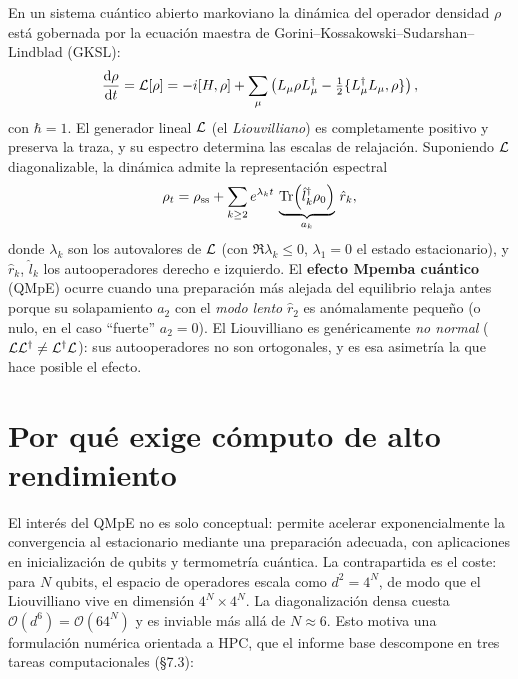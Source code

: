 En un sistema cuántico abierto markoviano la dinámica del operador densidad
$\rho$ está gobernada por la ecuación maestra de Gorini--Kossakowski--Sudarshan--Lindblad
(GKSL):
\begin{equation}
    \frac{\dd\rho}{\dd t} = \mathcal{L}[\rho]
    = -i[H,\rho] + \sum_{\mu}\left( L_\mu\rho L_\mu^\dagger
      - \tfrac{1}{2}\{L_\mu^\dagger L_\mu, \rho\}\right),
    \label{eq:gksl}
\end{equation}
con $\hbar=1$. El generador lineal $\mathcal{L}$ (el \emph{Liouvilliano}) es completamente
positivo y preserva la traza, y su espectro determina las escalas de relajación.
Suponiendo $\mathcal{L}$ diagonalizable, la dinámica admite la representación espectral
\begin{equation}
    \rho_t = \rho_{\mathrm{ss}} + \sum_{k\ge 2} e^{\lambda_k t}\,
             \underbrace{\Tr(\hat l_k^\dagger \rho_0)}_{a_k}\,\hat r_k,
    \label{eq:spectral}
\end{equation}
donde $\lambda_k$ son los autovalores de $\mathcal{L}$ (con $\Re\lambda_k\le 0$,
$\lambda_1=0$ el estado estacionario), y $\hat r_k$, $\hat l_k$ los autooperadores
derecho e izquierdo. El \textbf{efecto Mpemba cuántico} (QMpE) ocurre cuando una
preparación más alejada del equilibrio relaja antes porque su solapamiento $a_2$
con el \emph{modo lento} $\hat r_2$ es anómalamente pequeño (o nulo, en el caso
``fuerte'' $a_2=0$). El Liouvilliano es genéricamente \emph{no normal}
($\mathcal{L}\mathcal{L}^\dagger\neq\mathcal{L}^\dagger\mathcal{L}$): sus autooperadores no son ortogonales, y
es esa asimetría la que hace posible el efecto.

\section{Por qué exige cómputo de alto rendimiento}

El interés del QMpE no es solo conceptual: permite acelerar exponencialmente la
convergencia al estacionario mediante una preparación adecuada, con aplicaciones
en inicialización de qubits y termometría cuántica. La contrapartida es el coste:
para $N$ qubits, el espacio de operadores escala como $d^2 = 4^N$, de modo que el
Liouvilliano vive en dimensión $4^N\times 4^N$. La diagonalización densa cuesta
$\mathcal{O}(d^6)=\mathcal{O}(64^N)$ y es inviable más allá de $N\approx 6$. Esto
motiva una formulación numérica orientada a HPC, que el informe base descompone en
tres tareas computacionales (\S 7.3):

